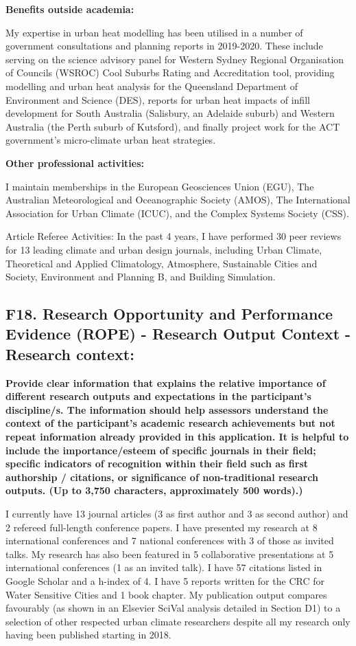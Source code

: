 \textbf{Benefits outside academia:}

My expertise in urban heat modelling has been utilised in a number of government consultations and planning reports in 2019-2020. These include serving on the science advisory panel for Western Sydney Regional Organisation of Councils (WSROC) Cool Suburbs Rating and Accreditation tool, providing modelling and urban heat analysis for the Queensland Department of Environment and Science (DES), reports for urban heat impacts of infill development for South Australia (Salisbury, an Adelaide suburb) and Western Australia (the Perth suburb of Kutsford), and finally project work for the ACT government's micro-climate urban heat strategies.



\textbf{Other professional activities:}

I maintain memberships in the European Geosciences Union (EGU), The Australian Meteorological and Oceanographic Society (AMOS), The International Association for Urban Climate (ICUC), and the Complex Systems Society (CSS).

Article Referee Activities: In the past 4 years, I have performed 30 peer reviews for 13 leading climate and urban design journals, including Urban Climate, Theoretical and Applied Climatology, Atmosphere, Sustainable Cities and Society, Environment and Planning B, and Building Simulation.





\subsection*{\TitleFont F18. Research Opportunity and Performance Evidence (ROPE) - Research Output Context - Research context: }

\textbf{Provide clear information that explains the relative importance of different research outputs and expectations in the participant's discipline/s. The information should help assessors understand the context of the participant's academic research achievements but not repeat information already provided in this application. It is helpful to include the importance/esteem of specific journals in their field; specific indicators of recognition within their field such as first authorship / citations, or significance of non-traditional research outputs. (Up to 3,750 characters, approximately 500 words).)}

I currently have 13 journal articles (3 as first author and 3 as second author) and 2 refereed full-length conference papers. I have presented my research at 8 international conferences and 7 national conferences with 3 of those as invited talks. My research has also been featured in 5 collaborative presentations at 5 international conferences (1 as an invited talk). I have 57 citations listed in Google Scholar and a h-index of 4. I have 5 reports written for the CRC for Water Sensitive Cities and 1 book chapter. My publication output compares favourably (as shown in an Elsevier SciVal analysis detailed in Section D1) to a selection of other respected urban climate researchers despite all my research only having been published starting in 2018. 

